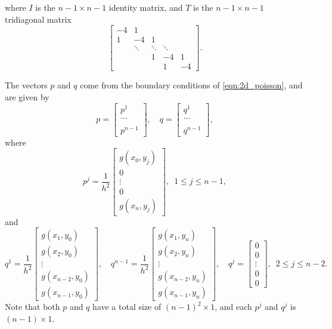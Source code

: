 where $I$ is the $n-1\times n-1$ %
identity matrix, and $T$ is the $n-1\times n-1$ tridiagonal matrix
\[\begin{bmatrix}
-4 & 1 & &  &\\
1 &-4 & 1 & &\\
&\ddots  & \ddots & \ddots & \\
&  & 1 & -4 & 1 \\
&  &  & 1 & -4 \end{bmatrix}.\]


The vectors $p$ and $q$ come from the boundary conditions of \eqref{eqn:2d_poisson}, and are given by 
\[p = \begin{bmatrix} p^1 \\ \ldots \\ \\ p^{n-1} \end{bmatrix}, \quad  q = \begin{bmatrix} q^1 \\ \ldots \\ \\ q^{n-1} \end{bmatrix},\]
where 
\[p^j = \frac{1}{h^2} \begin{bmatrix} g(x_0,y_j)\\ 0 \\ \vdots \\0\\ g(x_n,y_j) \end{bmatrix} ,\,\,\, 1 \leq j \leq n-1,\]
and 
\[q^1 = \frac{1}{h^2}\begin{bmatrix} g(x_1,y_0)  \\ g(x_2,y_0) \\ \vdots \\ g(x_{n-2},y_0) \\ g(x_{n-1},y_0) \end{bmatrix}, \quad q^{n-1} = \frac{1}{h^2}\begin{bmatrix} g(x_1,y_n) \\ g(x_2,y_n)\\ \vdots \\ g(x_{n-2},y_n)\\ g(x_{n-1},y_n) \end{bmatrix}, \quad q^{j} = \begin{bmatrix} 0 \\ 0 \\ \vdots \\ 0 \\ 0 \end{bmatrix} ,\,\,\, 2 \leq j \leq n-2.\]
Note that both $p$ and $q$ have a total size of $(n-1)^2 \times 1$, and each $p^j$ and $q^j$ is $(n-1)\times1$.

